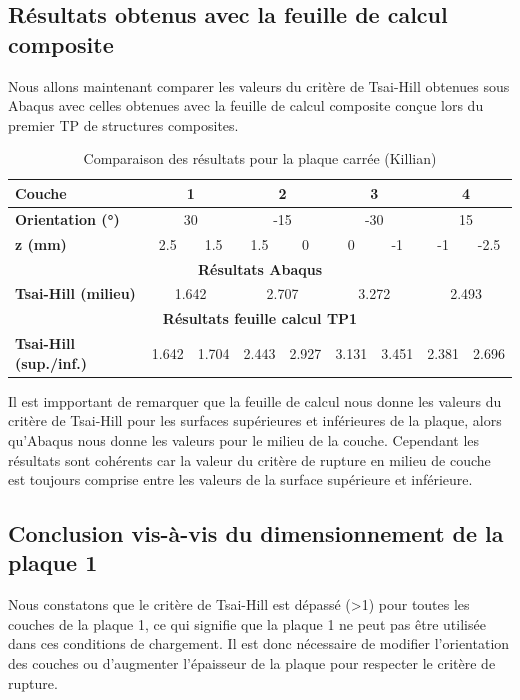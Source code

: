 \documentclass[a4paper,12pt]{article}
\begin{document}
\subsection{Résultats obtenus avec la feuille de calcul composite}
Nous allons maintenant comparer les valeurs du critère de Tsai-Hill obtenues sous Abaqus avec celles obtenues avec la feuille de calcul composite conçue lors du premier TP de structures composites.

\begin{table}[h]
	\centering
	\begin{tabular}{|l|c|c|c|c|c|c|c|c|}
	\hline
	\textbf{Couche} & \multicolumn{2}{c|}{1} & \multicolumn{2}{c|}{2} & \multicolumn{2}{c|}{3} & \multicolumn{2}{c|}{4} \\ \hline
	\textbf{Orientation (°)} & \multicolumn{2}{c|}{30} & \multicolumn{2}{c|}{-15} & \multicolumn{2}{c|}{-30} & \multicolumn{2}{c|}{15} \\ \hline
	\textbf{z (mm)} & 2.5 & 1.5 & 1.5 & 0 & 0 & -1 & -1 & -2.5 \\ \hline
	\multicolumn{9}{|c|}{\textbf{Résultats Abaqus}} \\ \hline
	\textbf{Tsai-Hill (milieu)} & \multicolumn{2}{c|}{1.642} & \multicolumn{2}{c|}{2.707} & \multicolumn{2}{c|}{3.272} & \multicolumn{2}{c|}{2.493} \\ \hline
	\multicolumn{9}{|c|}{\textbf{Résultats feuille calcul TP1}} \\ \hline
	\textbf{Tsai-Hill (sup./inf.)} & 1.642 & 1.704 & 2.443 & 2.927 & 3.131 & 3.451 & 2.381 & 2.696 \\ \hline
	\end{tabular}
	\caption{Comparaison des résultats pour la plaque carrée (Killian)}
	\label{fig:Comparaison plaque carrée}
\end{table}

Il est impportant de remarquer que la feuille de calcul nous donne les valeurs du critère de Tsai-Hill pour les surfaces supérieures et inférieures de la plaque, alors qu'Abaqus nous donne les valeurs pour le milieu de la couche. Cependant les résultats sont cohérents car la valeur du critère de rupture en milieu de couche est toujours comprise entre les valeurs de la surface supérieure et inférieure. 

\subsection{Conclusion vis-à-vis du dimensionnement de la plaque 1}
Nous constatons que le critère de Tsai-Hill est dépassé (>1) pour toutes les couches de la plaque 1, ce qui signifie que la plaque 1 ne peut pas être utilisée dans ces conditions de chargement. Il est donc nécessaire de modifier l'orientation des couches ou d'augmenter l'épaisseur de la plaque pour respecter le critère de rupture.
\end{document}
